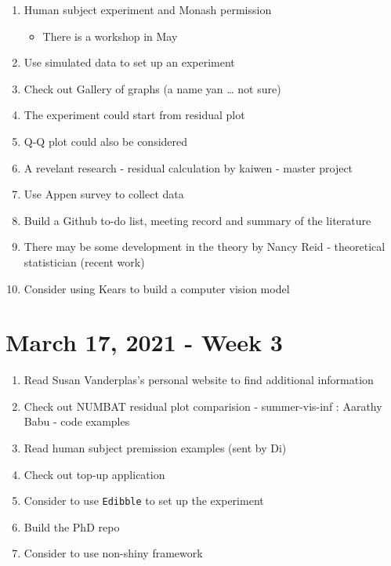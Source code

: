 \documentclass[
]{book}
\providecommand{\tightlist}{%
  \setlength{\itemsep}{0pt}\setlength{\parskip}{0pt}}
\begin{document}
\begin{enumerate}
\def\labelenumi{\arabic{enumi}.}
\tightlist
\item
  Human subject experiment and Monash permission

  \begin{itemize}
  \tightlist
  \item
    There is a workshop in May
  \end{itemize}
\item
  Use simulated data to set up an experiment
\item
  Check out Gallery of graphs (a name yan \ldots{} not sure)
\item
  The experiment could start from residual plot
\item
  Q-Q plot could also be considered
\item
  A revelant research - residual calculation by kaiwen - master project
\item
  Use Appen survey to collect data
\item
  Build a Github to-do list, meeting record and summary of the literature
\item
  There may be some development in the theory by Nancy Reid - theoretical statistician (recent work)
\item
  Consider using Kears to build a computer vision model
\end{enumerate}

\hypertarget{march-17-2021---week-3}{%
\section{March 17, 2021 - Week 3}\label{march-17-2021---week-3}}

\begin{enumerate}
\def\labelenumi{\arabic{enumi}.}
\tightlist
\item
  Read Susan Vanderplas's personal website to find additional information
\item
  Check out NUMBAT residual plot comparision - summer-vis-inf : Aarathy Babu - code examples
\item
  Read human subject premission examples (sent by Di)
\item
  Check out top-up application
\item
  Consider to use \texttt{Edibble} to set up the experiment
\item
  Build the PhD repo
\item
  Consider to use non-shiny framework
\end{enumerate}
\end{document}

